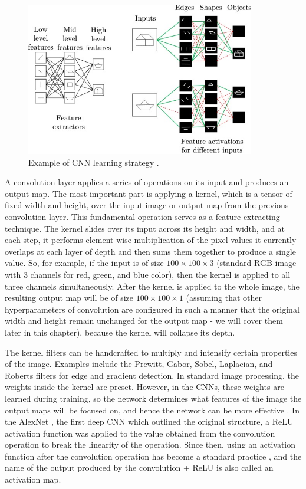 \begin{figure}[H]
\begin{centering}
\includegraphics[width=10cm]{assets/images/cnn.jpg}
\par\end{centering}
\caption{Example of CNN learning strategy \cite{Santosh2022-2}.}
\label{fig:cnn}
\end{figure}

A convolution layer applies a series of operations on its input and produces an output map. The most important part is applying a kernel, which is a tensor of fixed width and height, over the input image or output map from the previous convolution layer. This fundamental operation serves as a feature-extracting technique. The kernel slides over its input across its height and width, and at each step, it performs element-wise multiplication of the pixel values it currently overlaps at each layer of depth and then sums them together to produce a single value. So, for example, if the input is of size $100\!\times\!100\!\times\!3$ (standard RGB image with 3 channels for red, green, and blue color), then the kernel is applied to all three channels simultaneously. After the kernel is applied to the whole image, the resulting output map will be of size $100\!\times\!100\!\times\!1$ (assuming that other hyperparameters of convolution are configured in such a manner that the original width and height remain unchanged for the output map - we will cover them later in this chapter), because the kernel will collapse its depth. 

The kernel filters can be handcrafted to multiply and intensify certain properties of the image. Examples include the Prewitt, Gabor, Sobel, Laplacian, and Roberts filters for edge and gradient detection. In standard image processing, the weights inside the kernel are preset. However, in the CNNs, these weights are learned during training, so the network determines what features of the image the output maps will be focused on, and hence the network can be more effective \cite{Santosh2022-2, He2023}. In the AlexNet \cite{Krizhevsky2012}, the first deep CNN which outlined the original structure, a ReLU activation function was applied to the value obtained from the convolution operation to break the linearity of the operation. Since then, using an activation function after the convolution operation has become a standard practice \cite{Santosh2022-2, He2023}, and the name of the output produced by the convolution + ReLU is also called an activation map.


